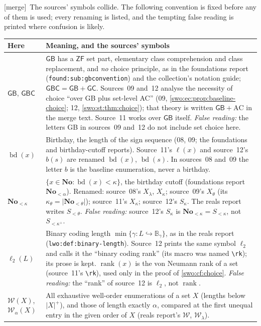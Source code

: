\documentclass[11pt]{article}
\theoremstyle{definition}
\theoremstyle{remark}
\newcommand{\No}{\mathbf{No}}
\newcommand{\WO}{\mathcal W}
\newcommand{\W}{\mathcal W}
\newcommand{\B}{\mathbb B}
\newcommand{\rk}{\operatorname{rank}}
\newcommand{\bl}{\ell_2}
\newcommand{\bd}{\operatorname{bd}}
\newcommand{\emb}{\hookrightarrow}
\newcommand{\GB}{\mathsf{GB}}
\newcommand{\GBC}{\mathsf{GBC}}
\newcommand{\ZF}{\mathsf{ZF}}
\newcommand{\GC}{\mathsf{GC}}
\newcommand{\card}[1]{\lvert #1\rvert}
\newcommand{\code}[1]{\texttt{\small #1}}
\newcommand{\merge}{\textsf{[merge]}}
\begin{document}
\merge\ The sources' symbols collide. The following convention is fixed
before any of them is used; every renaming is listed, and the tempting false
reading is printed where confusion is likely.

\begingroup\small
\begin{longtable}{@{}>{\raggedright\arraybackslash}p{}>{\raggedright\arraybackslash}p{}@{}}
\toprule
Here & Meaning, and the sources' symbols\\
\midrule\endhead
$\GB$, $\GBC$ &
$\GB$ has a $\ZF$ set part, elementary class comprehension and class
replacement, and \emph{no} choice principle, as in the foundations report
(\code{found:sub:gbconvention}) and the collection's notation guide;
$\GBC=\GB+\GC$. Sources~09 and~12 analyse the necessity of choice ``over GB
plus set-level AC'' (09, \cref{swo:ec:prop:baseline-choice}; 12,
\cref{swo:st:thm:choice}); that theory is written $\GB+\mathrm{AC}$ in the
merge text. Source~11 works over $\GB$ itself. \emph{False reading:} the
letters GB in sources~09 and~12 do not include set choice here.\\[3pt]
$\bd(x)$ &
Birthday, the length of the sign sequence (08, 09; the foundations and
birthday-cutoff reports). Source~11's $\ell(x)$ and source~12's $b(s)$ are
renamed $\bd(x)$, $\bd(s)$. In sources~08 and~09 the letter $b$ is the
baseline enumeration, never a birthday.\\[3pt]
$\No_{<\kappa}$ &
$\{x\in\No:\bd(x)<\kappa\}$, the birthday cutoff (foundations report
$\No_{<\alpha}$). Renamed: source~08's $X_\lambda$, $X_\kappa$; source~09's
$X_\theta$ (its $\kappa_\theta=\card{\No_{<\theta}}$); source~11's $X_\kappa$;
source~12's $S_\kappa$. The reals report writes $S_{<\theta}$.
\emph{False reading:} source~12's $S_\kappa$ is $\No_{<\kappa}=S_{<\kappa}$,
not $S_{<\kappa^+}$.\\[3pt]
$\bl(L)$ &
Binary coding length $\min\{\gamma:L\emb\B_\gamma\}$, as in the reals report
(\code{lwo:def:binary-length}). Source~12 prints the same symbol $\bl$ and
calls it the ``binary coding rank'' (its macro was named \verb|\rk|); its
prose is kept. $\rk(x)$ is the von Neumann rank of a set (source~11's
\verb|\rk|), used only in the proof of \cref{swo:cf:choice}. \emph{False
reading:} the ``rank'' of source~12 is $\bl$, not $\rk$.\\[3pt]
$\WO(X)$, $\WO_\alpha(X)$ &
All exhaustive well-order enumerations of a set $X$ (lengths below
$\card X^+$), and those of length exactly $\alpha$, compared at the first
unequal entry in the given order of $X$ (reals report's $\W$, $\W_\lambda$).

\end{longtable}
\end{document}
